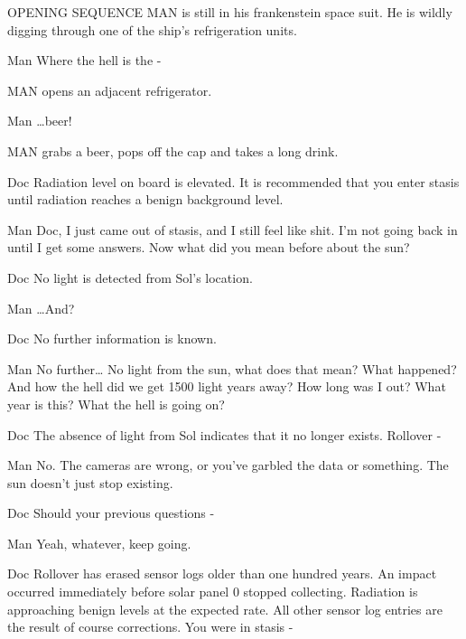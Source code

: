 \documentclass{screenplay}[2010/1/7]
\begin{document}
OPENING SEQUENCE
\fadein
MAN is still in his frankenstein space suit.  He is wildly digging through one of the ship's refrigeration units.
\begin{dialogue}{Man}
Where the hell is the -
\end{dialogue}
MAN opens an adjacent refrigerator.
\begin{dialogue}{Man}
\dots beer!
\end{dialogue}
MAN grabs a beer, pops off the cap and takes a long drink.
\begin{dialogue}{Doc}
Radiation level on board is elevated.  It is recommended that you enter stasis until radiation reaches a benign background level.
\end{dialogue}
\begin{dialogue}{Man}
Doc, I just came out of stasis, and I still feel like shit.  I'm not going back in until I get some answers.  Now what did you mean before about the sun?
\end{dialogue}
\begin{dialogue}{Doc}
No light is detected from Sol's location.
\end{dialogue}
\begin{dialogue}[impatient]{Man}
\dots And?
\end{dialogue}
\begin{dialogue}{Doc}
No further information is known.
\end{dialogue}
\begin{dialogue}{Man}
No further\dots
No light from the sun, what does that mean?  What happened?  And how the hell did we get 1500 light years away?  How long was I out?  What year is this?  What the hell is going on?
\end{dialogue}
\begin{dialogue}{Doc}
The absence of light from Sol indicates that it no longer exists.  Rollover -
\end{dialogue}
\begin{dialogue}[interrupting]{Man}
No.  The cameras are wrong, or you've garbled the data or something.  The sun doesn't just stop existing.
\end{dialogue}
\begin{dialogue}{Doc}
Should your previous questions -
\end{dialogue}
\begin{dialogue}[interrupting]{Man}
Yeah, whatever, keep going.
\end{dialogue}
\begin{dialogue}{Doc}
Rollover has erased sensor logs older than one hundred years.  An impact occurred immediately before solar panel 0 stopped collecting.  Radiation is approaching benign levels at the expected rate.  All other sensor log entries are the result of course corrections.  You were in stasis -
\end{dialogue}
\end{document}
